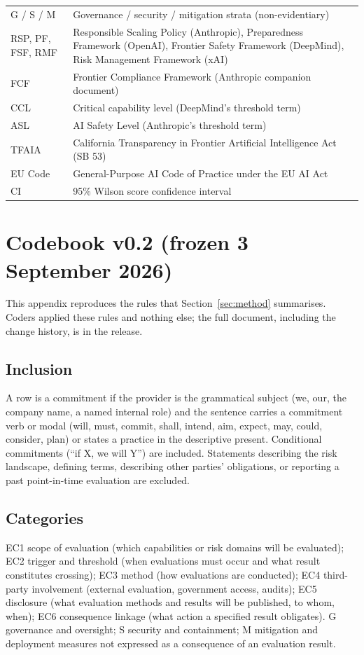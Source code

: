 \documentclass{article}
\begin{document}
\begin{table}[H]
\begin{tabular}{lp{9.4cm}}
G / S / M & Governance / security / mitigation strata (non-evidentiary) \\
RSP, PF, FSF, RMF & Responsible Scaling Policy (Anthropic), Preparedness Framework (OpenAI), Frontier Safety Framework (DeepMind), Risk Management Framework (xAI) \\
FCF & Frontier Compliance Framework (Anthropic companion document) \\
CCL & Critical capability level (DeepMind's threshold term) \\
ASL & AI Safety Level (Anthropic's threshold term) \\
TFAIA & California Transparency in Frontier Artificial Intelligence Act (SB 53) \\
EU Code & General-Purpose AI Code of Practice under the EU AI Act \\
CI & 95\% Wilson score confidence interval \\
\bottomrule
\end{tabular}
\end{table}

\section{Codebook v0.2 (frozen 3 September 2026)}
\label{apx:codebook}
This appendix reproduces the rules that Section~\ref{sec:method} summarises. Coders applied these rules and nothing else; the full document, including the change history, is in the release.
\subsection{Inclusion}
A row is a commitment if the provider is the grammatical subject (we, our, the company name, a named internal role) and the sentence carries a commitment verb or modal (will, must, commit, shall, intend, aim, expect, may, could, consider, plan) or states a practice in the descriptive present. Conditional commitments (``if X, we will Y'') are included. Statements describing the risk landscape, defining terms, describing other parties' obligations, or reporting a past point-in-time evaluation are excluded.
\subsection{Categories}
EC1 scope of evaluation (which capabilities or risk domains will be evaluated); EC2 trigger and threshold (when evaluations must occur and what result constitutes crossing); EC3 method (how evaluations are conducted); EC4 third-party involvement (external evaluation, government access, audits); EC5 disclosure (what evaluation methods and results will be published, to whom, when); EC6 consequence linkage (what action a specified result obligates). G governance and oversight; S security and containment; M mitigation and deployment measures not expressed as a consequence of an evaluation result.
\end{document}
